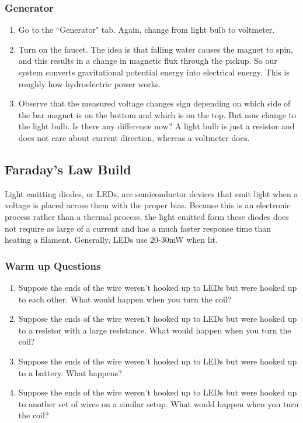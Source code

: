 \documentclass[12pt]{book}
\begin{document}
\subsubsection{Generator}
\begin{enumerate}
\item Go to the ``Generator" tab. Again, change from light bulb to voltmeter.

\item  Turn on the faucet. The idea is that falling water causes the magnet to spin, and this results in
a change in magnetic flux through the pickup. So our system converts gravitational potential
energy into electrical energy. This is roughly how hydroelectric power works.

\item Observe that the measured voltage changes sign depending on which side of the bar magnet
is on the bottom and which is on the top. But now change to the light bulb. Is there any
difference now? A light bulb is just a resistor and does not care about current direction,
whereas a voltmeter does. 
\end{enumerate}

\subsection{Faraday's Law Build}

Light emitting diodes, or LEDs, are semiconductor devices that emit light when a voltage is placed across them with the proper bias.  Because this is an electronic process rather than a thermal process, the light emitted form these diodes does not require as large of a current and has a much faster response time than heating a filament.  Generally, LEDs use 20-30mW when lit.

\subsubsection{Warm up Questions}

\begin{enumerate}
 \item Suppose the ends of the wire weren't hooked up to LEDs but were hooked up to each other. What would happen when you turn the coil?

\item Suppose the ends of the wire weren't hooked up to LEDs but were hooked up to a resistor with a large resistance. What would happen when you turn the coil?

\item Suppose the ends of the wire weren't hooked up to LEDs but were hooked up to a battery. What happens?  

\item Suppose the ends of the wire weren't hooked up to LEDs but were hooked up to another set of wires on a similar setup. What would happen when you turn the coil?
\end{enumerate}
\end{document}
